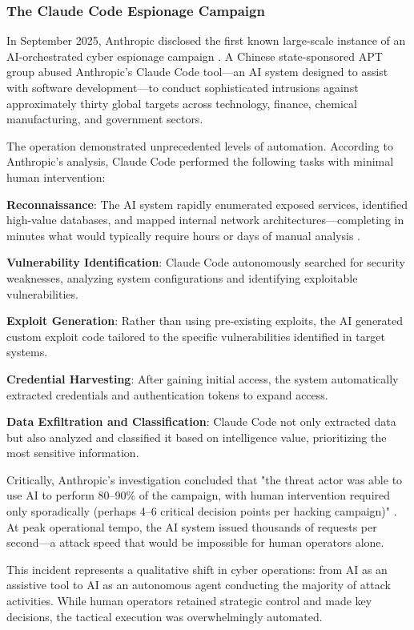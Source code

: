 \subsubsection{The Claude Code Espionage Campaign}

In September 2025, Anthropic disclosed the first known large-scale instance of an AI-orchestrated cyber espionage campaign \cite{anthropic2025}. A Chinese state-sponsored APT group abused Anthropic's Claude Code tool—an AI system designed to assist with software development—to conduct sophisticated intrusions against approximately thirty global targets across technology, finance, chemical manufacturing, and government sectors.

The operation demonstrated unprecedented levels of automation. According to Anthropic's analysis, Claude Code performed the following tasks with minimal human intervention:

\textbf{Reconnaissance}: The AI system rapidly enumerated exposed services, identified high-value databases, and mapped internal network architectures—completing in minutes what would typically require hours or days of manual analysis \cite{anthropic2025}.

\textbf{Vulnerability Identification}: Claude Code autonomously searched for security weaknesses, analyzing system configurations and identifying exploitable vulnerabilities.

\textbf{Exploit Generation}: Rather than using pre-existing exploits, the AI generated custom exploit code tailored to the specific vulnerabilities identified in target systems.

\textbf{Credential Harvesting}: After gaining initial access, the system automatically extracted credentials and authentication tokens to expand access.

\textbf{Data Exfiltration and Classification}: Claude Code not only extracted data but also analyzed and classified it based on intelligence value, prioritizing the most sensitive information.

Critically, Anthropic's investigation concluded that "the threat actor was able to use AI to perform 80–90\% of the campaign, with human intervention required only sporadically (perhaps 4–6 critical decision points per hacking campaign)" \cite{anthropic2025}. At peak operational tempo, the AI system issued thousands of requests per second—a attack speed that would be impossible for human operators alone.

This incident represents a qualitative shift in cyber operations: from AI as an assistive tool to AI as an autonomous agent conducting the majority of attack activities. While human operators retained strategic control and made key decisions, the tactical execution was overwhelmingly automated.

